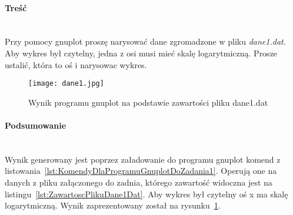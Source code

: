\paragraph{Treść}~\\
Przy pomocy gnuplot proszę narysować dane zgromadzone w pliku \textit{dane1.dat}.
Aby wykres był czytelny, jedna z osi musi mieć skalę logarytmiczną.
Prosze ustalić, która to oś i narysowac wykres.





\begin{figure}[h]
  \caption{Wynik programu gnuplot na podstawie zawartości pliku dane1.dat}
  \label{fig:WynikProgramuGnuplotNaPodstawieZawartosciPlikuDane1Dat}
  \centering
  \texttt{[image: dane1.jpg]}
\end{figure}

\paragraph{Podsumowanie}~\\
Wynik generowany jest poprzez załadowanie do programu gnuplot komend z listowania~\ref{lst:KomendyDlaProgramuGnuplotDoZadania1}.
Operują one na danych z pliku załączonego do zadnia, którego zawartość widoczna jest na listingu~\ref{lst:ZawartoscPlikuDane1Dat}.
Aby wykres był czytelny oś x ma skalę logarytmiczną.
Wynik zaprezentowany został na rysunku~\ref{fig:WynikProgramuGnuplotNaPodstawieZawartosciPlikuDane1Dat}.
